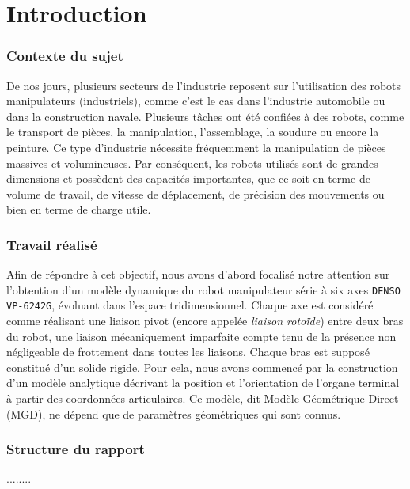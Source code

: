 \documentclass[12pt,a4paper,twoside]{report}
\newcommand{\clearemptydoublepage}{\newpage{\pagestyle{empty}\cleardoublepage}}
\begin{document}
\dominitoc


\clearemptydoublepage
%
\tableofcontents
\listoffigures
\listoftables

\clearemptydoublepage
{}

\chapter*{Introduction \label{Sec:Intro}}

\subsection*{Contexte du sujet}
De nos jours, plusieurs secteurs de l'industrie reposent sur l'utilisation des robots manipulateurs (industriels), comme c'est le cas dans l'industrie automobile ou dans la construction navale. Plusieurs tâches ont été confiées à des robots, comme le transport de pièces, la manipulation, l'assemblage, la soudure ou encore la peinture. Ce type d'industrie nécessite fréquemment la manipulation de pièces massives et volumineuses. Par conséquent, les robots utilisés sont de grandes dimensions et possèdent des capacités importantes, que ce soit en terme de volume de travail, de vitesse de déplacement, de précision des mouvements ou bien en terme de charge utile.

\subsection*{Travail réalisé}
Afin de répondre à cet objectif, nous avons d'abord focalisé notre attention sur l'obtention d'un modèle dynamique du robot manipulateur série à six axes \verb"DENSO VP-6242G", évoluant dans l'espace tridimensionnel. Chaque axe est considéré comme réalisant une liaison pivot (encore appelée \emph{liaison rotoïde}) entre deux bras du robot, une liaison mécaniquement imparfaite compte tenu de la présence non négligeable de frottement dans toutes les liaisons. 
Chaque bras est supposé constitué d'un solide rigide. Pour cela, nous avons commencé par la construction d'un modèle analytique décrivant la position et l'orientation de l'organe terminal à partir des coordonnées articulaires. Ce modèle, dit Modèle Géométrique Direct (MGD), ne dépend que de paramètres géométriques qui sont connus. 

\subsection*{Structure du rapport}
........
\end{document}
